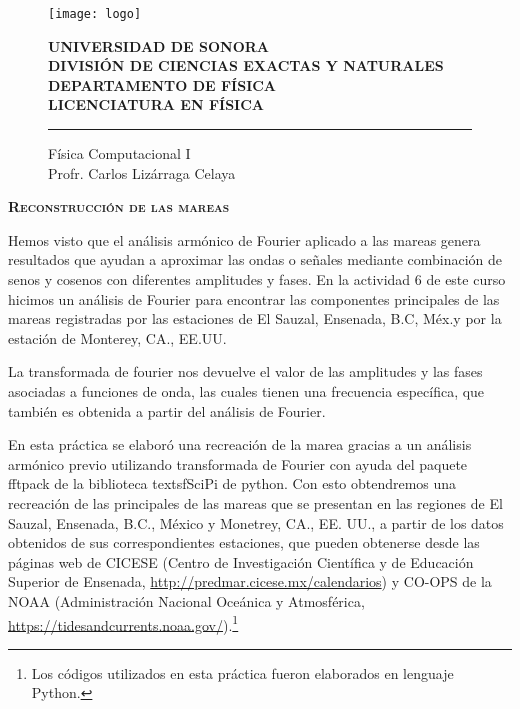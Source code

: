
\date{25 de abril de 2017}


\begin{titlepage}

    \begin{figure}[ht!]
    \centering
    \texttt{[image: logo]}
    
    \textbf{UNIVERSIDAD DE SONORA \\ DIVISIÓN DE CIENCIAS EXACTAS Y NATURALES \\ DEPARTAMENTO DE FÍSICA \\ LICENCIATURA EN FÍSICA}
	\maketitle
    \hrule \bigskip
    \large{Física Computacional I}\\
	Profr. Carlos Lizárraga Celaya
    \end{figure}
\thispagestyle{empty}

\end{titlepage}

\newpage

\begin{center}
\huge{\textbf{\textsc{Reconstrucción de las mareas}}}
\end{center}
\noindent  Hemos visto que el análisis armónico de Fourier  aplicado a las mareas genera resultados que ayudan a aproximar las ondas o señales mediante combinación de senos y cosenos con diferentes amplitudes y fases. En la actividad 6 de este curso hicimos un análisis de Fourier para encontrar las componentes principales de las mareas registradas por las estaciones de El Sauzal, Ensenada, B.C, Méx.y por la estación de Monterey, CA., EE.UU.

La transformada de fourier nos devuelve el valor de las amplitudes y las fases asociadas a funciones de onda, las cuales tienen una frecuencia específica, que también es obtenida a partir del análisis de Fourier.

En esta práctica se elaboró una recreación de la marea gracias a un análisis armónico previo utilizando  transformada de Fourier con ayuda del paquete \textsf{fftpack} de la biblioteca textsf{SciPi} de \textsf{python}. Con esto obtendremos una recreación de las principales de las mareas que se presentan en las regiones de El Sauzal, Ensenada, B.C., México y  Monetrey, CA., EE. UU., a partir de los datos obtenidos de sus correspondientes estaciones, que pueden obtenerse desde las páginas web de CICESE (Centro de Investigación Científica y de Educación Superior de Ensenada, \url{http://predmar.cicese.mx/calendarios})
y CO-OPS de la NOAA (Administración Nacional Oceánica y Atmosférica, \url{https://tidesandcurrents.noaa.gov/}).\footnote{Los códigos utilizados en esta práctica fueron elaborados en lenguaje Python.}

